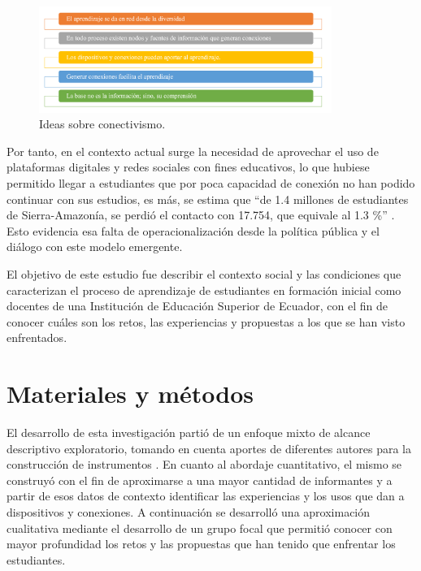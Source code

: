 \documentclass[spanish]{textolivre}
\begin{document}
\begin{figure}[htbp]
 \centering
 \includegraphics[width=0.85\textwidth]{Fig02.jpg}
 \caption{Ideas sobre conectivismo.}
 \label{Fig02}
\end{figure}

Por tanto, en el contexto actual surge la necesidad de aprovechar el uso de plataformas digitales y redes sociales con fines educativos, lo que hubiese permitido llegar a estudiantes que por poca capacidad de conexión no han podido continuar con sus estudios, es más, se estima que “de 1.4 millones de estudiantes de Sierra-Amazonía, se perdió el contacto con 17.754, que equivale al 1.3 \%” \cite[párr. 6]{el_comercio_rastro_2020}. Esto evidencia esa falta de operacionalización desde la política pública y el diálogo con este modelo emergente. 

El objetivo de este estudio fue describir el contexto social y las condiciones que caracterizan el proceso de aprendizaje de estudiantes en formación inicial como docentes de una Institución de Educación Superior de Ecuador, con el fin de conocer cuáles son los retos, las experiencias y propuestas a los que se han visto enfrentados.

\section{Materiales y métodos}\label{sec-normas}
El desarrollo de esta investigación partió de un enfoque mixto de alcance descriptivo exploratorio, tomando en cuenta aportes de diferentes autores para la construcción de instrumentos \cite{restrepo_mesa_metodos_2020, pereira_perez_disenos_2011, hernandez_sampieri_metodologiinvestigacion_2014}. En cuanto al abordaje cuantitativo, el mismo se construyó con el fin de aproximarse a una mayor cantidad de informantes y a partir de esos datos de contexto identificar las experiencias y los usos que dan a dispositivos y conexiones. A continuación se desarrolló una aproximación cualitativa mediante el desarrollo de un grupo focal que permitió conocer con mayor profundidad los retos y las propuestas que han tenido que enfrentar los estudiantes.
\end{document}
